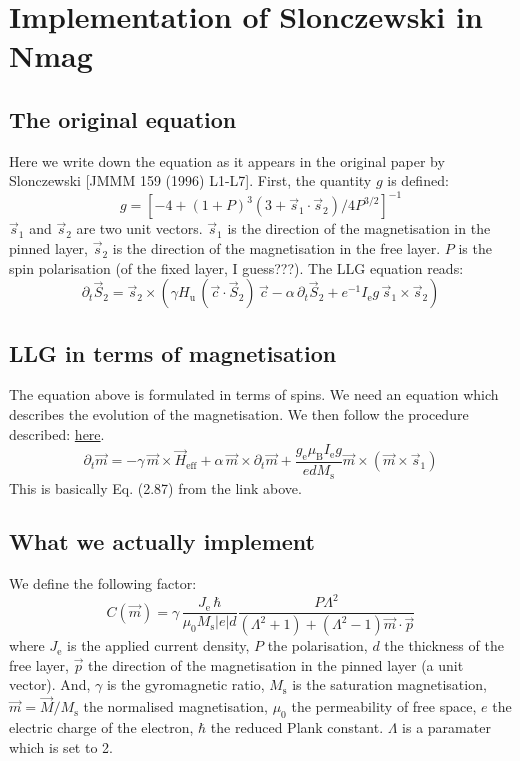 \documentclass[11pt]{article}
\newcommand{\vv}[1]{\vec{#1}}
\newcommand{\vvM}{\vv{M}}
\newcommand{\vvm}{\vv{m}}
\newcommand{\vvH}{\vv{H}_{\mathrm{eff}}}
\newcommand{\vvfix}{\vv{p}}
\newcommand{\Msat}{M_{\mathrm{s}}}
\newcommand{\derivp}[2]{\partial_{#2} #1}
\begin{document}
\section{Implementation of Slonczewski in Nmag}

\subsection{The original equation}
Here we write down the equation as it appears in the original paper
by Slonczewski [JMMM 159 (1996) L1-L7].
First, the quantity $g$ is defined:
$$
g = \left[ -4 + (1 + P)^3 (3 + \vv{s}_1 \cdot \vv{s}_2)/ 4 P^{3/2} \right]^{-1}
$$
$\vv{s}_1$ and $\vv{s}_2$ are two unit vectors.
$\vv{s}_1$ is the direction of the magnetisation in the pinned layer,
$\vv{s}_2$ is the direction of the magnetisation in the free layer.
$P$ is the spin polarisation (of the fixed layer, I guess???).
The LLG equation reads:
$$
\derivp{\vv{S}_2}{t} = 
  \vv{s}_2 \times 
    \left( \gamma H_{\mathrm{u}} \, (\vv{c} \cdot \vv{S}_2) \, \vv{c}
          - \alpha \, \derivp{\vv{S}_2}{t}
          + e^{-1} I_{\mathrm{e}} g \, \vv{s}_1 \times \vv{s}_2 \right)
$$

\subsection{LLG in terms of magnetisation}
The equation above is formulated in terms of spins.
We need an equation which describes the evolution of the magnetisation.
We then follow the procedure described:
\href{http://wpage.unina.it/mdaquino/PhD\_thesis/main/node47.html}{here}.
$$
\derivp{\vvm}{t} =
   -\gamma \, \vvm \times \vvH 
  + \alpha \, \vvm \times \derivp{\vvm}{t}
  + \frac{g_{\mathrm{e}} \mu_{\mathrm{B}} I_{\mathrm{e}} g}{ed\Msat} \vvm \times (\vvm \times \vv{s}_1)
$$
This is basically Eq. (2.87) from the link above.

\subsection{What we actually implement}
We define the following factor:
$$
C(\vvm) = 
  \gamma \,
  \frac{J_{\mathrm{e}} \, \hbar}{\mu_0 \Msat |e| d} \frac{P \Lambda^2}{(\Lambda^2+1)+(\Lambda^2-1)\vvm \cdot \vvfix}
$$
where $J_{\mathrm{e}}$ is the applied current density, $P$ the polarisation,
$d$ the thickness of the free layer, $\vvfix$ the direction of the
magnetisation in the pinned layer (a unit vector).
%
And, $\gamma$ is the gyromagnetic ratio,
$\Msat$ is the saturation magnetisation,
$\vvm = \vvM/\Msat$ the normalised magnetisation, $\mu_0$ the permeability
of free space, $e$ the electric charge of the electron,
$\hbar$ the reduced Plank constant.
$\Lambda$ is a paramater which is set to 2.
\end{document}
